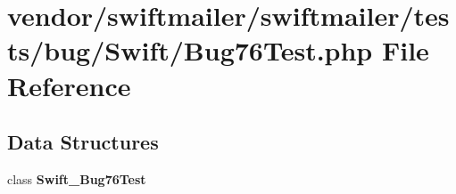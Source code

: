 \section{vendor/swiftmailer/swiftmailer/tests/bug/\+Swift/\+Bug76\+Test.php File Reference}
\label{_bug76_test_8php}
\subsection*{Data Structures}
\begin{DoxyCompactItemize}
\item 
class {\bf Swift\+\_\+\+Bug76\+Test}
\end{DoxyCompactItemize}
